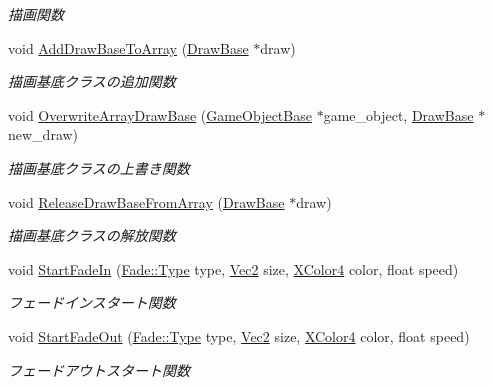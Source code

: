 \begin{DoxyCompactItemize}
\begin{DoxyCompactList}\small\item\em 描画関数 \end{DoxyCompactList}\item 
void \mbox{\hyperlink{class_draw_manager_a9dbd645fdbf927cd43d400335ff9b286}{Add\+Draw\+Base\+To\+Array}} (\mbox{\hyperlink{class_draw_base}{Draw\+Base}} $\ast$draw)
\begin{DoxyCompactList}\small\item\em 描画基底クラスの追加関数 \end{DoxyCompactList}\item 
void \mbox{\hyperlink{class_draw_manager_a94ef5a241c8d78187a2a6c0ed3c9efec}{Overwrite\+Array\+Draw\+Base}} (\mbox{\hyperlink{class_game_object_base}{Game\+Object\+Base}} $\ast$game\+\_\+object, \mbox{\hyperlink{class_draw_base}{Draw\+Base}} $\ast$new\+\_\+draw)
\begin{DoxyCompactList}\small\item\em 描画基底クラスの上書き関数 \end{DoxyCompactList}\item 
void \mbox{\hyperlink{class_draw_manager_a287d1f359b87f075b22df6a9b6e99316}{Release\+Draw\+Base\+From\+Array}} (\mbox{\hyperlink{class_draw_base}{Draw\+Base}} $\ast$draw)
\begin{DoxyCompactList}\small\item\em 描画基底クラスの解放関数 \end{DoxyCompactList}\item 
void \mbox{\hyperlink{class_draw_manager_a735817ebc00535b7a014c82c4e22d77c}{Start\+Fade\+In}} (\mbox{\hyperlink{class_fade_ac06f27215b454aa05b93c236476d6e80}{Fade\+::\+Type}} type, \mbox{\hyperlink{_vector3_d_8h_a5ef6e95dfc5f9d3820b71772d99bbc25}{Vec2}} size, \mbox{\hyperlink{_vector3_d_8h_a680c30c4a07d86fe763c7e01169cd6cc}{X\+Color4}} color, float speed)
\begin{DoxyCompactList}\small\item\em フェードインスタート関数 \end{DoxyCompactList}\item 
void \mbox{\hyperlink{class_draw_manager_ac3715e23c7ef4e694eb0453dff92f014}{Start\+Fade\+Out}} (\mbox{\hyperlink{class_fade_ac06f27215b454aa05b93c236476d6e80}{Fade\+::\+Type}} type, \mbox{\hyperlink{_vector3_d_8h_a5ef6e95dfc5f9d3820b71772d99bbc25}{Vec2}} size, \mbox{\hyperlink{_vector3_d_8h_a680c30c4a07d86fe763c7e01169cd6cc}{X\+Color4}} color, float speed)
\begin{DoxyCompactList}\small\item\em フェードアウトスタート関数 \end{DoxyCompactList}\item 

\end{DoxyCompactItemize}
